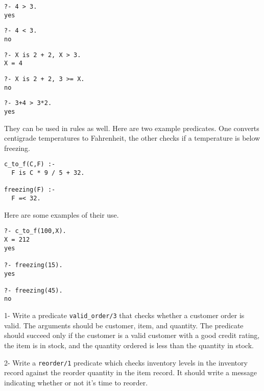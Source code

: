 \begin{verbatim}
?- 4 > 3.
yes
\end{verbatim}

\begin{verbatim}
?- 4 < 3.
no
\end{verbatim}

\begin{verbatim}
?- X is 2 + 2, X > 3.
X = 4
\end{verbatim}

\begin{verbatim}
?- X is 2 + 2, 3 >= X.
no
\end{verbatim}

\begin{verbatim}
?- 3+4 > 3*2.
yes
\end{verbatim}
They can be used in rules as well. Here are two example predicates. One converts
centigrade temperatures to Fahrenheit, the other checks if a temperature is
below freezing.

\begin{verbatim}
c_to_f(C,F) :-
  F is C * 9 / 5 + 32.

freezing(F) :-
  F =< 32.
\end{verbatim}
Here are some examples of their use.

\begin{verbatim}
?- c_to_f(100,X).
X = 212
yes

?- freezing(15).
yes

?- freezing(45).
no
\end{verbatim}

\secdown


1- Write a predicate \verb'valid_order/3' that checks whether a customer order
is valid. The arguments should be customer, item, and quantity. The predicate
should succeed only if the customer is a valid customer with a good credit
rating, the item is in stock, and the quantity ordered is less than the quantity
in stock.

2- Write a \verb'reorder/1' predicate which checks inventory levels in the
inventory record against the reorder quantity in the item record. It should
write a message indicating whether or not it's time to reorder.

\secup
\secup